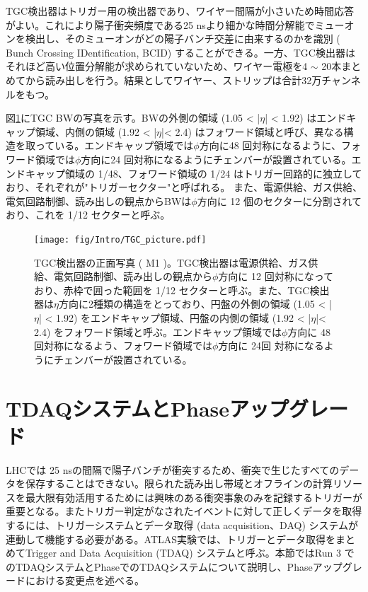 TGC検出器はトリガー用の検出器であり、ワイヤー間隔が小さいため時間応答がよい。これにより陽子衝突頻度である25 nsより細かな時間分解能でミューオンを検出し、そのミューオンがどの陽子バンチ交差に由来するのかを識別 ( Bunch Crossing IDentification, BCID) することができる。一方、TGC検出器はそれほど高い位置分解能が求められていないため、ワイヤー電極を4 $\sim$ 20本まとめてから読み出しを行う。結果としてワイヤー、ストリップは合計32万チャンネルをもつ。

図\ref{TGC_picture}にTGC BWの写真を示す。BWの外側の領域 (1.05 < |$\eta$| < 1.92) はエンドキャップ領域、内側の領域  (1.92 < |$\eta$|< 2.4) はフォワード領域と呼び、異なる構造を取っている。エンドキャップ領域では$\phi$方向に48 回対称になるように、フォワード領域では$\phi$方向に24 回対称になるようにチェンバーが設置されている。エンドキャップ領域の 1/48、フォワード領域の 1/24 はトリガー回路的に独立しており、それぞれが"トリガーセクター"と呼ばれる。
また、電源供給、ガス供給、電気回路制御、読み出しの観点からBWは$\phi$方向に 12 個のセクターに分割されており、これを 1/12 セクターと呼ぶ。
\begin{figure} 
    \centering
    \texttt{[image: fig/Intro/TGC\_picture.pdf]}
    \caption[TGC検出器]{TGC検出器の正面写真 ( M1 )\cite{cern_document_server}。TGC検出器は電源供給、ガス供給、電気回路制御、読み出しの観点から$\phi$方向に 12 回対称になっており、赤枠で囲った範囲を 1/12 セクターと呼ぶ。また、TGC検出器は$\eta$方向に2種類の構造をとっており、円盤の外側の領域  (1.05 < |$\eta$| < 1.92) をエンドキャップ領域、円盤の内側の領域  (1.92 < |$\eta$|< 2.4) をフォワード領域と呼ぶ。エンドキャップ領域では$\phi$方向に 48 回対称になるよう、フォワード領域では$\phi$方向に 24回 対称になるようにチェンバーが設置されている。}
    \label{TGC_picture}
\end{figure}



\section{TDAQシステムとPhase\two アップグレード}
\label{sec_TDAQ}
    LHCでは 25 nsの間隔で陽子バンチが衝突するため、衝突で生じたすべてのデータを保存することはできない。限られた読み出し帯域とオフラインの計算リソースを最大限有効活用するためには興味のある衝突事象のみを記録するトリガーが重要となる。またトリガー判定がなされたイベントに対して正しくデータを取得するには、トリガーシステムとデータ取得 (data acquisition、DAQ) システムが連動して機能する必要がある。ATLAS実験では、トリガーとデータ取得をまとめてTrigger and Data Acquisition (TDAQ) システムと呼ぶ。本節ではRun 3 でのTDAQシステムとPhase\two でのTDAQシステムについて説明し、Phase\two アップグレードにおける変更点を述べる。
   

